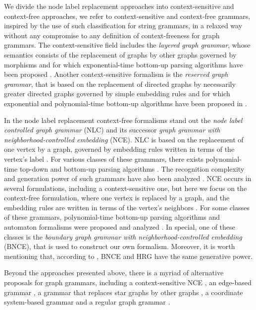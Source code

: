 \documentclass[]{report}
\begin{document}
We divide the node label replacement approaches into context-sensitive and context-free approaches, we refer to context-sensitive and context-free grammars, inspired by the use of such classification for string grammars, in a relaxed way without any compromise to any definition of context-freeness for graph grammars. The context-sensitive field includes the \textit{layered graph grammar}, whose semantics consists of the replacement of graphs by other graphs governed by morphisms \cite{rekers1997defining} and for which exponential-time bottom-up parsing algorithms have been proposed \cite{rekers1995graph,bottoni2000efficient,furst2011improving}. Another context-sensitive formalism is the \textit{reserved graph grammar}, that is based on the replacement of directed graphs by necessarily greater directed graphs governed by simple embedding rules \cite{zhang2001context} and for which exponential and polynomial-time bottom-up algorithms have been proposed in \cite{zeng2005rgg+,zou2017partial}.

In the node label replacement context-free formalisms stand out the  \textit{node label controlled graph grammar} (NLC) and its successor \textit{graph grammar with neighborhood-controlled embedding} (NCE). NLC is based on the replacement of one vertex by a graph, governed by embedding rules written in terms of the vertex's label \cite{rozenberg1986boundary}. For various classes of these grammars, there exists polynomial-time top-down and bottom-up parsing algorithms \cite{flasinski1993parsing,flasinski2014characteristics, rozenberg1986boundary, wanke1991algorithms}. The recognition complexity and generation power of such grammars have also been analyzed \cite{flasinski1998power,kim2012structure}. NCE occurs in several formulations, including a context-sensitive one, but here we focus on the context-free formulation, where one vertex is replaced by a graph, and the embedding rules are written in terms of the vertex's neighbors \cite{janssens1982graph,skodinis1998neighborhood}. For some classes of these grammars, polynomial-time bottom-up parsing algorithms and automaton formalisms were proposed and analyzed \cite{kim2001efficient,brandenburg2005finite}. In special, one of these classes is the \textit{boundary graph grammar with neighborhood-controlled embedding} (BNCE), that is used to construct our own formalism. Moreover, it is worth mentioning that, according to \cite{engelfiet1990comparison}, BNCE and HRG have the same generative power.

Beyond the approaches presented above, there is a myriad of alternative proposals for graph grammars, including a context-sensitive NCE \cite{adachi1999nce}, an edge-based grammar \cite{shi2015method}, a grammar that replaces star graphs by other graphs \cite{drewes2010adaptive}, a coordinate system-based grammar \cite{kong2006spatial} and a regular graph grammar \cite{gilroy2017parsing}.
\end{document}
